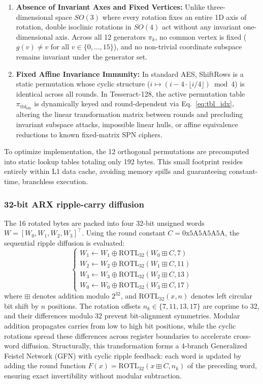 \documentclass[10pt,twocolumn]{article}
\begin{document}
\begin{enumerate}
    \item \textbf{Absence of Invariant Axes and Fixed Vertices:} Unlike three-dimensional space $SO(3)$ where every rotation fixes an entire 1D axis of rotation, double isoclinic rotations in $SO(4)$ act without any invariant one-dimensional axis. Across all 12 generators $\pi_k$, no common vertex is fixed ($g(v) \neq v$ for all $v \in \{0, \dots, 15\}$), and no non-trivial coordinate subspace remains invariant under the generator set.
    \item \textbf{Fixed Affine Invariance Immunity:} In standard AES, ShiftRows is a static permutation whose cyclic structure ($i \mapsto (i - 4 \cdot \lfloor i/4 \rfloor) \bmod 4$) is identical across all rounds. In Tesseract-128, the active permutation table $\pi_{\text{tbl}_{\text{idx}}}$ is dynamically keyed and round-dependent via Eq.~\eqref{eq:tbl_idx}, altering the linear transformation matrix between rounds and precluding invariant subspace attacks, impossible linear hulls, or affine equivalence reductions to known fixed-matrix SPN ciphers.
\end{enumerate}
To optimize implementation, the 12 orthogonal permutations are precomputed into static lookup tables totaling only 192 bytes. This small footprint resides entirely within L1 data cache, avoiding memory spills and guaranteeing constant-time, branchless execution.

\subsubsection{32-bit ARX ripple-carry diffusion}
The 16 rotated bytes are packed into four 32-bit unsigned words $W = [W_0, W_1, W_2, W_3]^\top$. Using the round constant $C = \text{0x5A5A5A5A}$, the sequential ripple diffusion is evaluated:
\begin{equation}
\begin{cases}
    W_1 \leftarrow W_1 \oplus \text{ROTL}_{32}(W_0 \boxplus C, 7) \\
    W_2 \leftarrow W_2 \oplus \text{ROTL}_{32}(W_1 \boxplus C, 11) \\
    W_3 \leftarrow W_3 \oplus \text{ROTL}_{32}(W_2 \boxplus C, 13) \\
    W_0 \leftarrow W_0 \oplus \text{ROTL}_{32}(W_3 \boxplus C, 17)
\end{cases}
\end{equation}
where $\boxplus$ denotes addition modulo $2^{32}$, and $\text{ROTL}_{32}(x, n)$ denotes left circular bit shift by $n$ positions. The rotation offsets $n_k \in \{7, 11, 13, 17\}$ are coprime to 32, and their differences modulo 32 prevent bit-alignment symmetries. Modular addition propagates carries from low to high bit positions, while the cyclic rotations spread these differences across register boundaries to accelerate cross-word diffusion. Structurally, this transformation forms a 4-branch Generalized Feistel Network (GFN) with cyclic ripple feedback: each word is updated by adding the round function $F(x) = \text{ROTL}_{32}(x \boxplus C, n_k)$ of the preceding word, ensuring exact invertibility without modular subtraction.
\end{document}
